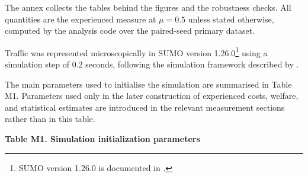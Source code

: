 \documentclass{article}
\begin{document}
The annex collects the tables behind the figures and the robustness checks. All quantities are the experienced measure at $\mu = 0.5$ unless stated otherwise, computed by the analysis code over the paired-seed primary dataset.

Traffic was represented microscopically in SUMO version 1.26.0\footnote{SUMO version 1.26.0 is documented in \textcite{sumo2026}.} using a simulation step of 0.2 seconds, following the simulation framework described by \textcite{alvarezLopezEtAl2018}.

The main parameters used to initialise the simulation are summarised in Table M1. Parameters used only in the later construction of experienced costs, welfare, and statistical estimates are introduced in the relevant measurement sections rather than in this table.

\noindent\textbf{Table M1. Simulation initialization parameters}
\end{document}
